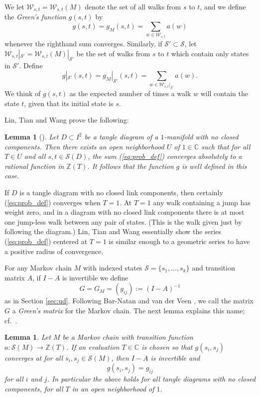 \documentclass[11pt,hyp,]{nyjm}
\newcommand{\Z}{\mathbb{Z}}
\newcommand{\C}{\mathbb{C}}
\numberwithin{thm}{section}
\newtheorem{lemma}[thm]{Lemma}
\theoremstyle{definition}
\theoremstyle{remark}
\begin{document}
	We let $\mathcal{W}_{s,t} = \mathcal{W}_{s,t}(M)$ denote the set of all walks from $s$ to $t$, and we define the {\em Green's function} $g(s,t)$ by
	\begin{equation}
		\label{eq:prob_def}
		g(s,t) = g_M(s,t)= \sum_{w \in \mathcal{W}_{s,t}} a(w)
	\end{equation}
	whenever the righthand sum converges. Similarly, if $\mathcal{S'} \subset \mathcal{S}$, let $\mathcal{W}_{s,t}|_\mathcal{S'} = \mathcal{W}_{s,t}(M)|_\mathcal{S'} $ be the set of walks from $s$ to $t$ which contain only states in $\mathcal{S'}$. Define
	$$
	g|_{\mathcal{S}'}(s,t) =  g_M|_{\mathcal{S'}}(s,t) =  \sum_{w \in \mathcal{W}_{s,t}|_\mathcal{S'}} a(w).
	$$
	We think of $g(s,t)$ as the expected number of times a walk $w$ will contain the state $t$, given that its initial state is $s$.
	
	Lin, Tian and Wang prove the following:
	\begin{lemma}[]
		\label{lem:ltw}
		Let $D \subset I^2$ be a tangle diagram of a $1$-manifold with no closed components. Then there exists an open neighborhood $U$ of $1 \in \C$ such that for all $T \in U$ and all $s,t \in \mathcal{S}(D)$, the sum (\ref{eq:prob_def}) converges absolutely to a rational function in $\Z(T)$. It follows that the function $g$ is well defined in this case.
	\end{lemma}
	If $D$ is a tangle diagram with no closed link components, then certainly (\ref{eq:prob_def}) converges when $T = 1$. At $T = 1$ any walk containing a jump has weight zero, and in a diagram with no closed link components there is at most one jump-less walk between any pair of states. (This is the walk given just by following the diagram.) Lin, Tian and Wang essentially show the series (\ref{eq:prob_def}) centered at $T = 1$ is similar enough to a geometric series to have a positive radius of convergence.
	
	For any Markov chain $M$ with indexed states $\mathcal{S} = \{s_1, \dots, s_k\}$ and transition matrix $A$, if $I - A$ is invertible we define
	$$
	G = G_M = (g_{ij}) := (I - A)^{-1}
	$$
	as in Section \ref{sec:ud}. Following Bar-Natan and van der Veen \cite{bnvdv22}, we call the matrix $G$ a {\em Green's matrix} for the Markov chain. The next lemma explains this name; cf.~\cite[Proposition 5]{bnvdv22}.
	
	\begin{lemma}
		\label{lem:path_conv}
		Let $M$ be a Markov chain with transition function $a : \mathcal{S}(M) \to \Z(T)$. If an evaluation $T \in \C$ is chosen so that $g(s_i,s_j)$ converges at for all $s_i,s_j \in \mathcal{S}(M)$, then $I - A$ is invertible and
		$$
		g(s_i,s_j) = g_{ij}
		$$
		for all $i$ and $j$. In particular the above holds for all tangle diagrams with no closed components, for all $T$ in an open neighborhood of $1$.
	\end{lemma}
\end{document}
